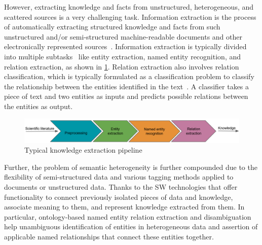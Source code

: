 However, extracting knowledge and facts from unstructured, heterogeneous, and scattered sources is a very challenging task. Information extraction is the process of automatically extracting structured knowledge and facts from such unstructured and/or semi-structured machine-readable documents and other electronically represented sources~\cite{Liddy.2001}. Information extraction is typically divided into multiple subtasks~\cite{Jurafsky.2014} like entity extraction, named entity recognition, and relation extraction, as shown in \cref{fig:IE_pipeline}. Relation extraction also involves relation classification, which is typically formulated as a classification problem to classify the relationship between the entities identified in the text~\cite{xue2019fine}. A classifier takes a piece of text and two entities as inputs and predicts possible relations between the entities as output. 

\begin{figure}[h]
    \centering
    \includegraphics[width=\textwidth]{images/cb_v2.png}
    \caption{Typical knowledge extraction pipeline}
    \label{fig:IE_pipeline}
\end{figure}

\hspace*{3.5mm} Further, the problem of semantic heterogeneity is further compounded due to the flexibility of semi-structured data and various tagging methods applied to documents or unstructured data. Thanks to the SW technologies that offer functionality to connect previously isolated pieces of data and knowledge, associate meaning to them, and represent knowledge extracted from them. In particular, ontology-based named entity relation extraction and disambiguation help unambiguous identification of entities in heterogeneous data and assertion of applicable named relationships that connect these entities together. 


